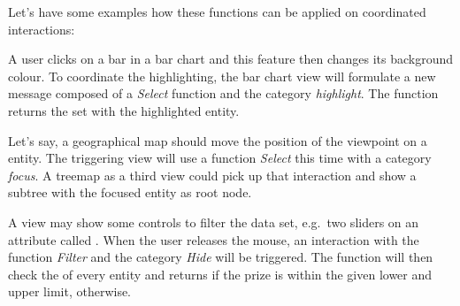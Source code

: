Let's have some examples how these functions can be applied on coordinated interactions:

A user clicks on a bar in a bar chart and this feature then changes its background colour.
To coordinate the highlighting, the bar chart view will formulate a new message composed of a \emph{Select} function and the category \emph{highlight}.
The function returns the set with the highlighted entity.

Let's say, a geographical map should move the position of the viewpoint on a entity.
The triggering view will use a function \emph{Select} this time with a category \emph{focus}.
A treemap as a third view could pick up that interaction and show a subtree with the focused entity as root node. 

A view may show some controls to filter the data set, e.g.\ two sliders on an attribute called .
When the user releases the mouse, an interaction with the function \emph{Filter} and the category \emph{Hide} will be triggered.  
The function will then check the  of every entity and returns  if the prize is within the given lower and upper limit,  otherwise.


